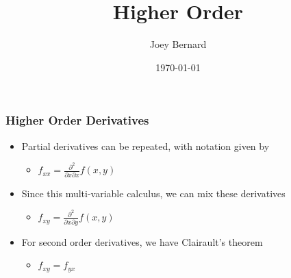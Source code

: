 \documentclass{beamer}
\title{Higher Order}
\author{Joey Bernard}
\institute{University of New Brunswick}
\date{\today}
\begin{document}
\begin{frame}
  \titlepage
\end{frame}

\begin{frame}
  \frametitle{Higher Order Derivatives}
  \begin{itemize}
  \item Partial derivatives can be repeated, with notation given by
    \begin{itemize}
    \item $f_{xx} = \frac{\partial^2}{\partial x \partial x}f(x,y)$
    \end{itemize}
  \item Since this multi-variable calculus, we can mix these derivatives
    \begin{itemize}
    \item $f_{xy} = \frac{\partial^2}{\partial x \partial y}f(x,y)$
    \end{itemize}
  \item For second order derivatives, we have Clairault's theorem
    \begin{itemize}
    \item $f_{xy} = f_{yx}$
    \end{itemize}
  \end{itemize}
\end{frame}
\end{document}
